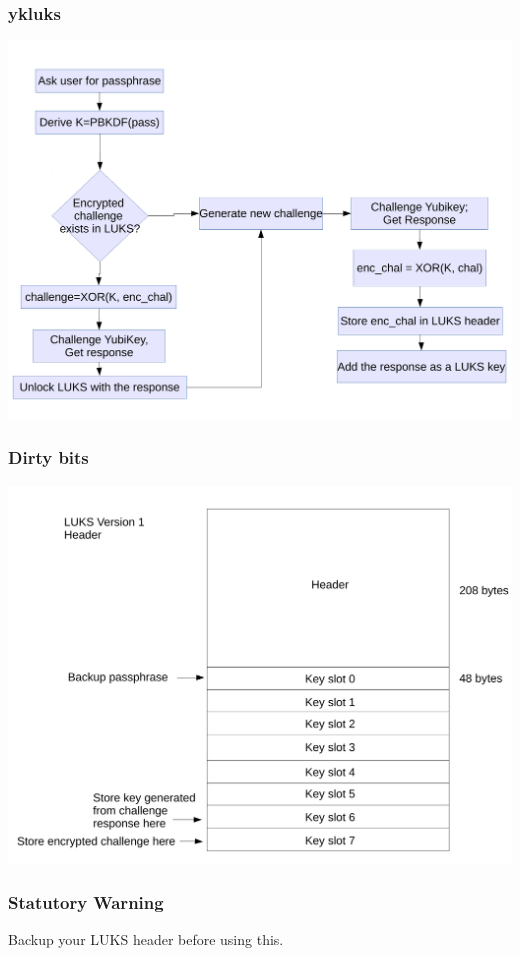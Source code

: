 \documentclass{beamer}
\begin{document}
\begin{frame}
  \frametitle{ykluks}
  \begin{center}
    \includegraphics[width=\textwidth]{flowchart}
  \end{center}
\end{frame}

\begin{frame}
  \frametitle{Dirty bits}
  \begin{center}
    \includegraphics[width=\textwidth]{luks_header}
  \end{center}
\end{frame}

\begin{frame}
  \frametitle{Statutory Warning}
  \begin{center}
    Backup your LUKS header before using this.
  \end{center}
\end{frame}
\end{document}
